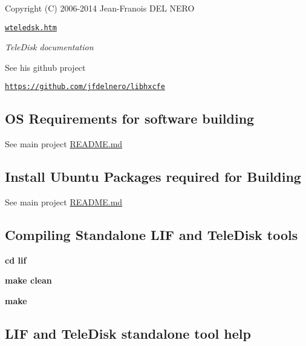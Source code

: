 \begin{DoxyItemize}
\begin{DoxyItemize}
\begin{DoxyItemize}
\begin{DoxyItemize}
\item Copyright (C) 2006-\/2014 Jean-\/\+Franois D\+EL N\+E\+RO
\begin{DoxyItemize}
\item \href{lif/teledisk/wteledsk.htm}{\tt wteledsk.\+htm}
\begin{DoxyItemize}
\item {\itshape Tele\+Disk documentation}
\end{DoxyItemize}
\item See his github project
\begin{DoxyItemize}
\item \href{https://github.com/jfdelnero/libhxcfe}{\tt https\+://github.\+com/jfdelnero/libhxcfe}
\end{DoxyItemize}
\end{DoxyItemize}
\end{DoxyItemize}
\end{DoxyItemize}
\end{DoxyItemize}
\end{DoxyItemize}





\subsection*{OS Requirements for software building}


\begin{DoxyItemize}
\item See main project \hyperlink{md_README}{R\+E\+A\+D\+ME.md}
\end{DoxyItemize}

\subsection*{Install Ubuntu Packages required for Building}


\begin{DoxyItemize}
\item See main project \hyperlink{md_README}{R\+E\+A\+D\+ME.md}
\end{DoxyItemize}

\subsection*{Compiling Standalone L\+IF and Tele\+Disk tools}


\begin{DoxyItemize}
\item {\bfseries cd lif}
\item {\bfseries make clean}
\item {\bfseries make} \subsection*{L\+IF and Tele\+Disk standalone tool help}
\end{DoxyItemize}


